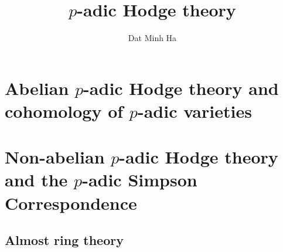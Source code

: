 

\setcounter{section}{-1}





	\title{\texorpdfstring{$p$}{}-adic Hodge theory}
	
	\author{Dat Minh Ha}
	\maketitle
	
	{
      \hypersetup{} 
      \tableofcontents %
    }
    
    
	
	\chapter{Abelian \texorpdfstring{$p$}{}-adic Hodge theory and cohomology of \texorpdfstring{$p$}{}-adic varieties}
	    
	    
	    
	
	\chapter{Non-abelian \texorpdfstring{$p$}{}-adic Hodge theory and the \texorpdfstring{$p$}{}-adic Simpson Correspondence}
	    
	    
	    
	    
	    
	    
    \begin{appendices}
        \chapter{Almost ring theory}
            
    \end{appendices}
	
	\printbibliography

